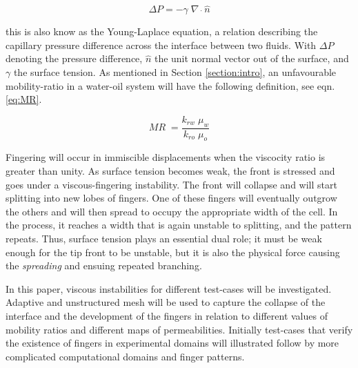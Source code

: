 \documentclass[preprint,authoryear,12pt]{elsarticle}
\begin{document}
\begin{equation}
\Delta P= - \gamma \; \nabla \; \dot \; \hat{n} 
\label{eq:pressure_dif} 
\end{equation}

\noindent this is also know as the Young-Laplace equation, a relation describing the capillary pressure difference across the interface between two fluids. With $\Delta P$ denoting the pressure difference, $\hat{n}$ the unit normal vector out of the surface, and $\gamma$ the surface tension. As mentioned in Section \ref{section:intro}, an unfavourable mobility-ratio in a water-oil system will have the following definition, see eqn.\ref{eq:MR}.

\begin{equation}
 MR \; = \frac{k_{rw} \; \mu_{w}}{k_{ro} \; \mu_{o}} 
\label{eq:MR}
\end{equation}

\noindent Fingering will occur in immiscible displacements when the viscocity ratio is greater than unity. %
As surface tension becomes weak, the front is stressed and goes under a viscous-fingering instability. The front will collapse and will start splitting into new lobes of fingers. One of these fingers will eventually outgrow the others and will then spread to occupy the appropriate width of the cell. In the process, it reaches a width that is again unstable to splitting, and the pattern repeats. Thus, surface tension plays an essential dual role; it must be weak enough for the tip front to be unstable, but it is also the physical force causing the \textit{spreading} and ensuing repeated branching.

In  this paper, viscous instabilities for different test-cases will be investigated. Adaptive and unstructured mesh will be used to capture the collapse of the interface and the development of the fingers in relation to different values of mobility ratios and different maps of permeabilities. Initially test-cases that verify the existence of fingers in experimental domains will illustrated follow by more complicated computational domains and finger patterns.  

\end{document}
